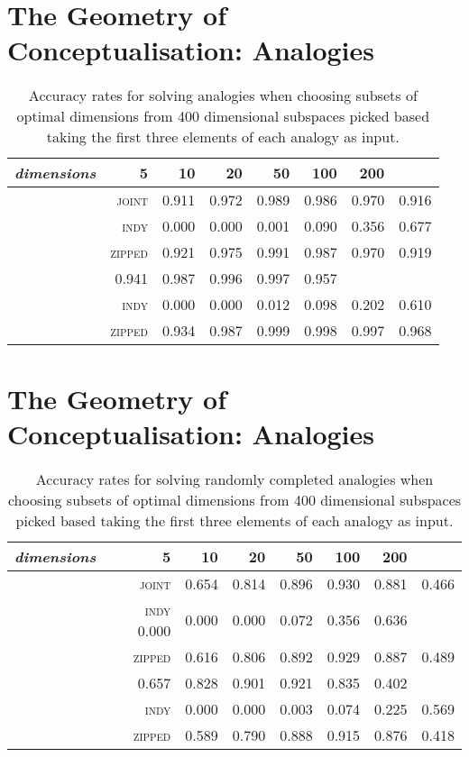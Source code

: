\chapter{The Geometry of Conceptualisation: Analogies} \label{chap:analogy}
\begin{table}
\begin{tabular}{lrrrrrr}
\hline
\emph{dimensions} & 5 & 10 & 20 & 50 & 100 & 200 \\
\hline
\parbox[t]{2mm}{} & \textsc{joint} & 0.911 & 0.972 & 0.989 & 0.986 & 0.970 & 0.916 \\
& \textsc{indy} & 0.000 & 0.000 & 0.001 & 0.090 & 0.356 & 0.677 \\
& \textsc{zipped} & 0.921 & 0.975 & 0.991 & 0.987 & 0.970 & 0.919 \\
\hline
\parbox[t]{2mm}{} & 0.941 & 0.987 & 0.996 & 0.997 & 0.957 \\
& \textsc{indy} & 0.000 & 0.000 & 0.012 & 0.098 & 0.202 & 0.610 \\
& \textsc{zipped} & 0.934 & 0.987 & 0.999 & 0.998 & 0.997 & 0.968 \\
\hline
\end{tabular}
\caption[Finding Spaces for Known Analogies]{Accuracy rates for solving analogies when choosing subsets of optimal dimensions from 400 dimensional subspaces picked based taking the first three elements of each analogy as input.}
\end{table}

\chapter{The Geometry of Conceptualisation: Analogies} \label{chap:analogy}
\begin{table}
\begin{tabular}{lrrrrrr}
\hline
\emph{dimensions} & 5 & 10 & 20 & 50 & 100 & 200 \\
\hline
\parbox[t]{2mm}{} & \textsc{joint} & 0.654 & 0.814 & 0.896 & 0.930 & 0.881 & 0.466 \\
& \textsc{indy} 0.000 & 0.000 & 0.000 & 0.072 & 0.356 & 0.636 \\
& \textsc{zipped} & 0.616 & 0.806 & 0.892 & 0.929 & 0.887 & 0.489 \\
\hline
\parbox[t]{2mm}{} & 0.657 & 0.828 & 0.901 & 0.921 & 0.835 & 0.402 \\
& \textsc{indy} & 0.000 & 0.000 & 0.003 & 0.074 & 0.225 & 0.569 \\
& \textsc{zipped} & 0.589 & 0.790 & 0.888 & 0.915 & 0.876 & 0.418 \\
\hline
\end{tabular}
\caption[Finding Spaces for Fake Analogies]{Accuracy rates for solving randomly completed analogies when choosing subsets of optimal dimensions from 400 dimensional subspaces picked based taking the first three elements of each analogy as input.}
\end{table}

